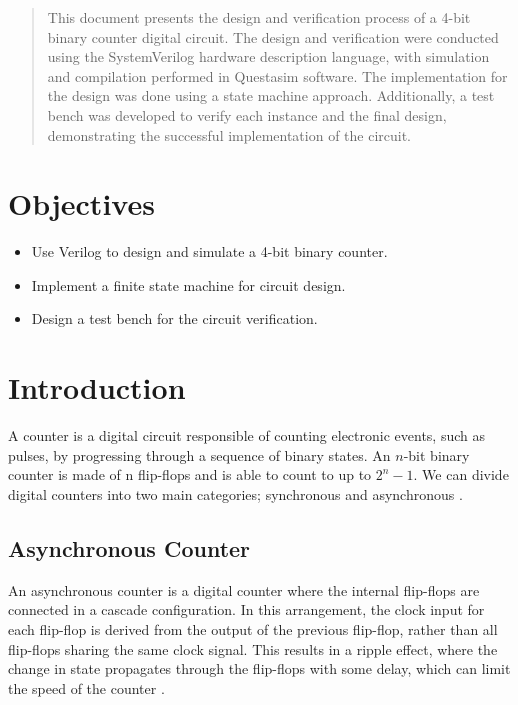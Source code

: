 \documentclass[conference]{IEEEtran}
\begin{document}
	
	\maketitle
	\begin{abstract}
		This document presents the design and verification process of a 4-bit binary counter digital circuit. The design and verification were conducted using the SystemVerilog hardware description language, with simulation and compilation performed in Questasim software. The implementation for the design was done using a state machine approach. Additionally, a test bench was developed to verify each instance and the final design, demonstrating the successful implementation of the circuit.
	\end{abstract}
	
	\section{Objectives}	
	\begin{itemize}
		\item Use Verilog to design and simulate a 4-bit binary counter.
		\item Implement a finite state machine for circuit design.
		\item Design a test bench for the circuit verification.
	\end{itemize}
	
	\section{Introduction}
	A counter is a digital circuit responsible of counting electronic events, such as pulses, by progressing through a sequence of binary states.
	An $n$-bit binary counter is made of n flip-flops and is able to count to up to $2^{n}-1$.
	We can divide digital counters into two main categories; synchronous and asynchronous \cite{floyd_fundamentos_nodate}.
	
	\subsection{Asynchronous Counter}
	An asynchronous counter is a digital counter where the internal flip-flops are connected in a cascade configuration. In this arrangement, the clock input for each flip-flop is derived from the output of the previous flip-flop, rather than all flip-flops sharing the same clock signal. This results in a ripple effect, where the change in state propagates through the flip-flops with some delay, which can limit the speed of the counter \cite{floyd_fundamentos_nodate}.
	
\end{document}
